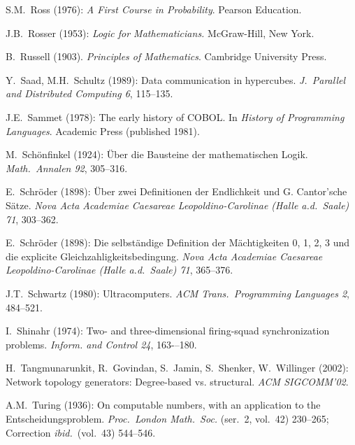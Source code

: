 \begin{thebibliography}{999}
S.M.~Ross (1976):
{\it A First Course in Probability}.
Pearson Education.

J.B.~Rosser (1953):
{\it Logic for Mathematicians.}
McGraw-Hill, New York.

B.~Russell (1903).  {\it Principles of Mathematics}.
Cambridge University Press. 



Y.~Saad, M.H.~Schultz (1989):
Data communication in hypercubes.
{\it J.~Parallel and Distributed Computing 6}, 115--135.


J.E.~Sammet (1978):
The early history of COBOL.  In {\it History of Programming
  Languages}.  Academic Press (published 1981).

M.~Sch\"onfinkel (1924): \"{U}ber die Bausteine der mathematischen
Logik.  {\it Math.~Annalen 92}, 305--316.

E.~Schr\"{o}der (1898): \"{U}ber zwei Definitionen der Endlichkeit und
G. Cantor'sche S\"{a}tze.  {\it Nova Acta Academiae Caesareae
Leopoldino-Carolinae (Halle a.d.~Saale) 71}, 303--362.

E.~Schr\"{o}der (1898): Die selbst\"{a}ndige Definition der
M\"{a}chtigkeiten 0, 1, 2, 3 und die explicite
Gleichzahligkeitsbedingung.  {\it Nova Acta Academiae Caesareae
Leopoldino-Carolinae (Halle a.d.~Saale) 71}, 365--376.

J.T.~Schwartz (1980):
Ultracomputers.
{\it ACM Trans.~Programming Languages 2}, 484--521.

I.~Shinahr (1974): Two- and three-dimensional firing-squad
synchronization problems.  {\it Inform. and Control 24}, 163-–180.



H.~Tangmunarunkit, R.~Govindan, S.~Jamin, S.~Shenker, W.~Willinger (2002):
Network topology generators: Degree-based vs.
structural.  {\it ACM SIGCOMM'02}.

A.M.~Turing (1936): On computable numbers, with an application to the
Entscheidungsproblem.  {\it Proc.~London Math.~Soc.} (ser.~2, vol.~42)
230--265; Correction {\it ibid.}~(vol.~43) 544--546.


\end{thebibliography}
